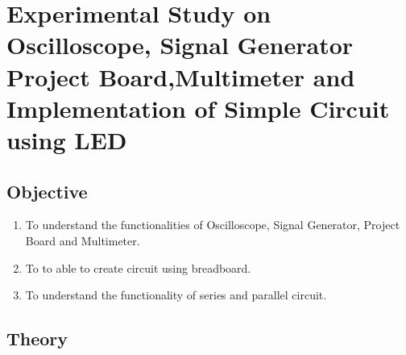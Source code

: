 \titlespacing*{\chapter}{0pt}{-15pt}{10pt}
\chapter{Experimental Study on Oscilloscope, Signal Generator Project Board,Multimeter and Implementation of Simple Circuit using LED}


\section{Objective}
\begin{enumerate}
    \item To understand the functionalities of Oscilloscope, Signal Generator, Project
          Board and Multimeter.
    \item To to able to create circuit using breadboard.
    \item To understand the functionality of series and parallel circuit.
\end{enumerate}

\section{Theory}
